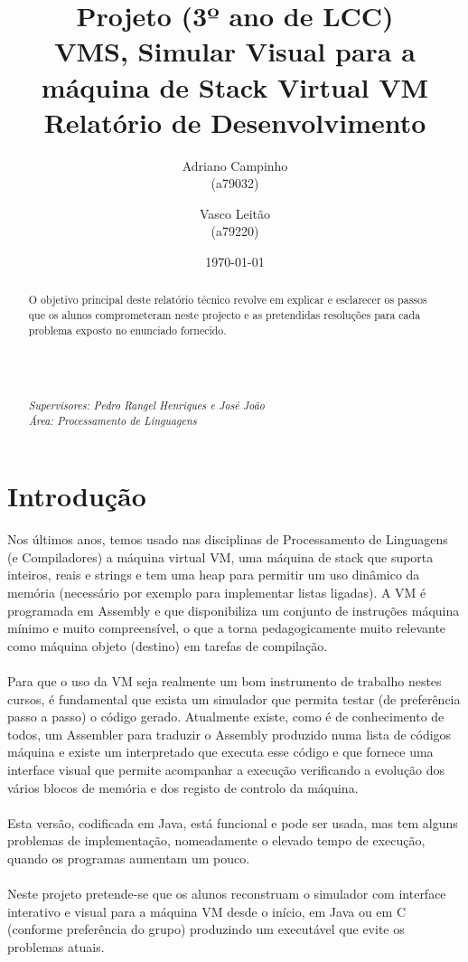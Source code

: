 \documentclass{report}
\title{Projeto (3º ano de LCC)\\ \textbf{VMS, Simular Visual para a máquina de Stack Virtual VM}\\ Relatório de Desenvolvimento}
\author{Adriano Campinho\\ (a79032) \and Vasco Leitão\\ (a79220) }
\date{\today}
\def\supers#1{{\em Supervisores: #1}\\ }
\def\area#1{{\em \'{A}rea: #1}\\[0.2cm]}
\begin{document}
\maketitle
\begin{abstract}
	\quad O objetivo principal deste relatório técnico revolve em explicar e esclarecer os passos
	que os alunos comprometeram neste projecto e as pretendidas resoluções
	para cada problema exposto no enunciado fornecido. \\
	\\
	\\
	\\
  \\
	\supers{Pedro Rangel Henriques e José João}
	\area{Processamento de Linguagens}

\end{abstract}

\tableofcontents

\chapter{Introdução} \label{intro}

\quad Nos últimos anos, temos usado nas disciplinas de Processamento de Linguagens (e
Compiladores) a máquina virtual VM, uma máquina de stack que suporta inteiros, reais e
strings e tem uma heap para permitir um uso dinâmico da memória (necessário por exemplo
para implementar listas ligadas). A VM é programada em Assembly e que disponibiliza um
conjunto de instruções máquina mínimo e muito compreensível, o que a torna
pedagogicamente muito relevante como máquina objeto (destino) em tarefas de compilação.
\\
\\
\quad Para que o uso da VM seja realmente um bom instrumento de trabalho nestes cursos, é
fundamental que exista um simulador que permita testar (de preferência passo a passo) o
código gerado. Atualmente existe, como é de conhecimento de todos, um Assembler para
traduzir o Assembly produzido numa lista de códigos máquina e existe um interpretado que
executa esse código e que fornece uma interface visual que permite acompanhar a execução
verificando a evolução dos vários blocos de memória e dos registo de controlo da máquina.
\\
\\
\quad Esta versão, codificada em Java, está funcional e pode ser usada, mas tem alguns problemas de
implementação, nomeadamente o elevado tempo de execução, quando os programas
aumentam um pouco.
\\
\\
\quad Neste projeto pretende-se que os alunos reconstruam o simulador com interface interativo e
visual para a máquina VM desde o início, em Java ou em C (conforme preferência do grupo)
produzindo um executável que evite os problemas atuais.
\end{document}
